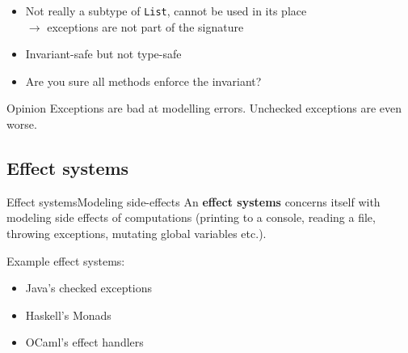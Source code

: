 \documentclass[compress,12pt,xcolor={dvipsnames}]{beamer}
\begin{document}
\begin{frame}
    \begin{itemize}
        \item Not really a subtype of \texttt{List}, cannot be used in its place
              \\$\to$ exceptions are not part of the signature
        \item Invariant-safe but not type-safe
        \item Are you sure all methods enforce the invariant?
    \end{itemize}
    \begin{alertblock}{Opinion}
        Exceptions are bad at modelling errors.  Unchecked exceptions are even worse. 
    \end{alertblock}
\end{frame}

\subsection{Effect systems}

\begin{frame}{Effect systems}{Modeling side-effects}
    An \textbf{effect systems} concerns itself with modeling side effects of computations (printing to a console, reading a file, throwing exceptions, mutating global variables etc.). 

    Example effect systems:

    \begin{itemize}
        \item Java's checked exceptions
        \item Haskell's Monads 
        \item OCaml's effect handlers
    \end{itemize}
\end{frame}
\end{document}
